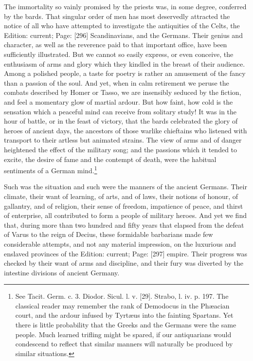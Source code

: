 The immortality so vainly promised by the priests was, in some degree, conferred by the bards. That singular order of men has most deservedly attracted the notice of all who have attempted to investigate the antiquities of the Celts, the Edition: current; Page: [296] Scandinavians, and the Germans. Their genius and character, as well as the reverence paid to that important office, have been sufficiently illustrated. But we cannot so easily express, or even conceive, the enthusiasm of arms and glory which they kindled in the breast of their audience. Among a polished people, a taste for poetry is rather an amusement of the fancy than a passion of the soul. And yet, when in calm retirement we peruse the combats described by Homer or Tasso, we are insensibly seduced by the fiction, and feel a momentary glow of martial ardour. But how faint, how cold is the sensation which a peaceful mind can receive from solitary study! It was in the hour of battle, or in the feast of victory, that the bards celebrated the glory of heroes of ancient days, the ancestors of those warlike chieftains who listened with transport to their artless but animated strains. The view of arms and of danger heightened the effect of the military song; and the passions which it tended to excite, the desire of fame and the contempt of death, were the habitual sentiments of a German mind.\footnote{See Tacit. Germ. c. 3. Diodor. Sicul. l. v. [29]. Strabo, l. iv. p. 197. The classical reader may remember the rank of Demodocus in the Phæacian court, and the ardour infused by Tyrtæus into the fainting Spartans. Yet there is little probability that the Greeks and the Germans were the same people. Much learned trifling might be spared, if our antiquarians would condescend to reflect that similar manners will naturally be produced by similar situations.}

Such was the situation and such were the manners of the ancient Germans. Their climate, their want of learning, of arts, and of laws, their notions of honour, of gallantry, and of religion, their sense of freedom, impatience of peace, and thirst of enterprise, all contributed to form a people of military heroes. And yet we find that, during more than two hundred and fifty years that elapsed from the defeat of Varus to the reign of Decius, these formidable barbarians made few considerable attempts, and not any material impression, on the luxurious and enslaved provinces of the Edition: current; Page: [297] empire. Their progress was checked by their want of arms and discipline, and their fury was diverted by the intestine divisions of ancient Germany.

